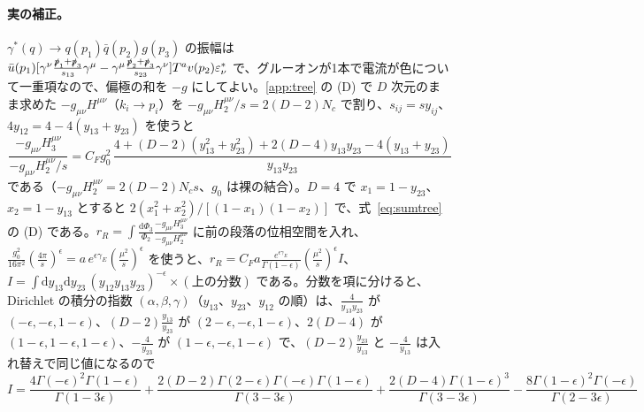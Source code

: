 \documentclass[a4paper,10pt]{ltjsarticle}
\newcommand{\dd}{\mathrm{d}}
\begin{document}
\paragraph{実の補正。}$\gamma^*(q)\to q(p_1)\bar q(p_2)g(p_3)$ の振幅は $\bar u(p_1)[\gamma^\nu\frac{\slashed p_1+\slashed p_3}{s_{13}}\gamma^\mu-\gamma^\mu\frac{\slashed p_2+\slashed p_3}{s_{23}}\gamma^\nu]T^av(p_2)\varepsilon^*_\nu$ で、グルーオンが1本で電流が色について一重項なので、偏極の和を $-g$ にしてよい。\ref{app:tree} の (D) で $D$ 次元のまま求めた $-g_{\mu\nu}H^{\mu\nu}$（$k_i\to p_i$）を $-g_{\mu\nu}H^{\mu\nu}_2/s=2(D-2)N_c$ で割り、$s_{ij}=sy_{ij}$、$4y_{12}=4-4(y_{13}+y_{23})$ を使うと
\begin{equation*}
\frac{-g_{\mu\nu}H^{\mu\nu}_3}{-g_{\mu\nu}H^{\mu\nu}_2/s}=C_Fg_0^2\,\frac{4+(D-2)(y_{13}^2+y_{23}^2)+2(D-4)y_{13}y_{23}-4(y_{13}+y_{23})}{y_{13}y_{23}}
\end{equation*}
である（$-g_{\mu\nu}H^{\mu\nu}_2=2(D-2)N_cs$、$g_0$ は裸の結合）。$D=4$ で $x_1=1-y_{23}$、$x_2=1-y_{13}$ とすると $2(x_1^2+x_2^2)/[(1-x_1)(1-x_2)]$ で、式~\eqref{eq:sumtree} の (D) である。$r_R=\int\frac{\dd\Phi_3}{\Phi_2}\frac{-g_{\mu\nu}H^{\mu\nu}_3}{-g_{\mu\nu}H^{\mu\nu}_2}$ に前の段落の位相空間を入れ、$\frac{g_0^2}{16\pi^2}(\frac{4\pi}{s})^\epsilon=a\,e^{\epsilon\gamma_E}(\frac{\mu^2}s)^\epsilon$ を使うと、$r_R=C_Fa\frac{e^{\epsilon\gamma_E}}{\Gamma(1-\epsilon)}(\frac{\mu^2}s)^\epsilon I$、$I=\int\dd y_{13}\dd y_{23}\,(y_{12}y_{13}y_{23})^{-\epsilon}\times(\text{上の分数})$ である。分数を項に分けると、Dirichlet の積分の指数 $(\alpha,\beta,\gamma)$（$y_{13}$、$y_{23}$、$y_{12}$ の順）は、$\frac4{y_{13}y_{23}}$ が $(-\epsilon,-\epsilon,1-\epsilon)$、$(D-2)\frac{y_{13}}{y_{23}}$ が $(2-\epsilon,-\epsilon,1-\epsilon)$、$2(D-4)$ が $(1-\epsilon,1-\epsilon,1-\epsilon)$、$-\frac4{y_{23}}$ が $(1-\epsilon,-\epsilon,1-\epsilon)$ で、$(D-2)\frac{y_{23}}{y_{13}}$ と $-\frac4{y_{13}}$ は入れ替えで同じ値になるので
\begin{equation*}
I=\frac{4\Gamma(-\epsilon)^2\Gamma(1-\epsilon)}{\Gamma(1-3\epsilon)}+\frac{2(D-2)\Gamma(2-\epsilon)\Gamma(-\epsilon)\Gamma(1-\epsilon)}{\Gamma(3-3\epsilon)}+\frac{2(D-4)\Gamma(1-\epsilon)^3}{\Gamma(3-3\epsilon)}-\frac{8\Gamma(1-\epsilon)^2\Gamma(-\epsilon)}{\Gamma(2-3\epsilon)}
\end{equation*}
\end{document}
